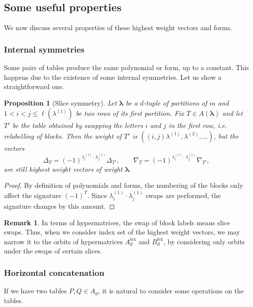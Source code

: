 \documentclass[12pt, reqno]{amsart}
\newtheorem{proposition}[theorem]{Proposition}
\theoremstyle{definition}
\newtheorem{remark}{Remark}[section]
\newcommand{\lex}{\mathrm{lex}}
\begin{document}

\subsection{Some useful properties}

We now discuss several properties of these highest weight vectors and forms. 

\subsubsection{Internal symmetries}
Some pairs of tables produce the same polynomial or form, up to a constant. This happens due to the existence of some internal symmetries. Let us show a straightforward one.

\begin{proposition}[Slice symmetry]\label{prop:slicesym}
    Let $\pmb{\lambda}$ be a $d$-tuple of partitions of $m$ and $1 < i < j \le \ell(\lambda^{(1)})$ be two rows of its first partition. Fix $T \in A(\pmb{\lambda})$ and let $T'$ be the table obtained by swapping the letters $i$ and $j$ %
    in the first row, i.e. relabelling of blocks. Then the weight of $T'$ is $((i,j)\lambda^{(1)},\lambda^{(2)},\ldots)$, but the vectors
    $$
        \Delta_T = (-1)^{\lambda_i^{(1)} \cdot \lambda_j^{(1)}}\Delta_{T'}, \qquad \nabla_T = (-1)^{\lambda_i^{(1)} \cdot \lambda_j^{(1)}}\nabla_{T'},
    $$
    are still highest weight vectors of weight $\pmb{\lambda}$. 
\end{proposition}
\begin{proof}
    By definition of polynomials and forms, the numbering of the blocks only affect the signature $(-1)^T$. Since $\lambda_i^{(1)} \cdot \lambda_j^{(1)}$ swaps are performed, the signature changes by this amount.
\end{proof}

\begin{remark}
    In terms of hypermatrices, the swap of block labels means slice swaps. Thus, when we consider index set of the highest weight vectors, we may narrow it to the orbits of hypermatrices $A^\lex_d$ and $B^\lex_d$, by considering only orbits under the swaps of certain slices.
\end{remark}


\subsubsection{Horizontal concatenation}
If we have two tables $P,Q \in A_d$, it is natural to consider some operations on the tables. %
\end{document}
